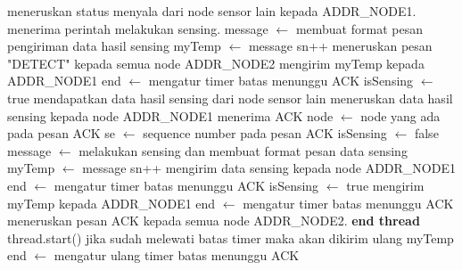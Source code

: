 \begin{algorithm}[H]
\begin{algorithmic}
                            \State meneruskan status menyala dari node sensor lain kepada ADDR\_NODE1.
                            \State menerima perintah melakukan sensing.
                            \State message $\leftarrow$ membuat format pesan pengiriman data hasil sensing
							\State myTemp $\leftarrow$ message
							\State sn++
							\If{ADDR\_NODE2.length > 0}
                                \State meneruskan pesan "DETECT" kepada semua node ADDR\_NODE2
                            \EndIf
                            \State mengirim myTemp kepada ADDR\_NODE1
                            \State end $\leftarrow$ mengatur timer batas menunggu ACK
                            \State isSensing $\leftarrow$ true
                            \State mendapatkan data hasil sensing dari node sensor lain
                            \State meneruskan data hasil sensing kepada node ADDR\_NODE1
                            \State menerima ACK
                            \State node $\leftarrow$ node yang ada pada pesan ACK
                                \State se $\leftarrow$ sequence number pada pesan ACK
                                    \State isSensing $\leftarrow$ false
                                    \State message $\leftarrow$ melakukan sensing dan membuat format pesan data sensing
									\State myTemp $\leftarrow$ message
									\State sn++
									\State mengirim data sensing kepada node ADDR\_NODE1
									\State end $\leftarrow$ mengatur timer batas menunggu ACK
									\State isSensing $\leftarrow$ true
                                \Else
                                    \State mengirim myTemp kepada ADDR\_NODE1
                                    \State end $\leftarrow$ mengatur timer batas menunggu ACK
                                \EndIf
                            \Else
                                \State meneruskan pesan ACK kepada semua node ADDR\_NODE2.
                            \EndIf
                        \EndIf
                    \endtry
                \EndWhile
            \EndFunction
        \EndIndent
    \State \textbf{end thread}
    \State thread.start()
                \State jika sudah melewati batas timer maka akan dikirim ulang myTemp
                \State end $\leftarrow$ mengatur ulang timer batas menunggu ACK
            \EndIf
        \EndIf
    \EndWhile
\EndFunction
\end{algorithmic}
\end{algorithm}


